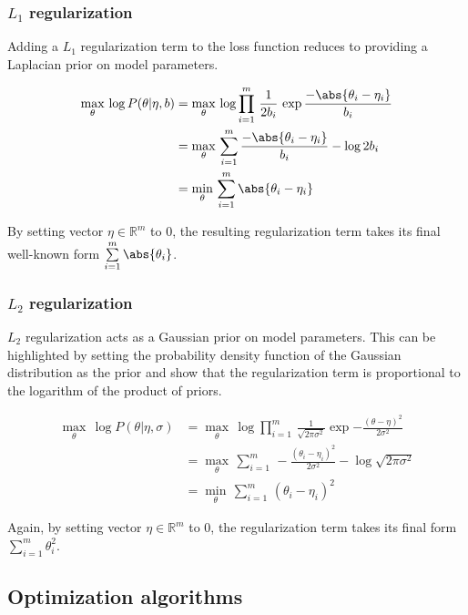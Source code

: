 	\subsubsection{$L_1$ regularization}

	   Adding a $L_1$ regularization term to the loss function reduces to providing a Laplacian
	   prior on model parameters.

	   \begin{align}
	       \max_{\theta}\, \log{P(\theta \vert \eta, b)}
		   & = \max_{\theta}\, \log{\prod\limits_{i=1}^m \, \frac{1}{2b_i}\,
		   \exp{\frac{- \abs{\theta_i - \eta_i}}{b_i}}} \\
		   & = \max_{\theta}\, \sum\limits_{i=1}^m \frac{- \abs{\theta_i - \eta_i}}{b_i} - \log{2b_i} \\
		   & = \min_{\theta}\, \sum\limits_{i=1}^m \abs{\theta_i - \eta_i}
	   \end{align}

	   By setting vector $\eta \in \mathbb{R}^m$ to $0$, the resulting regularization term
	   takes its final well-known form $\sum\limits_{i=1}^m \abs{\theta_i}$.

	\subsubsection{$L_2$ regularization}

	   $L_2$ regularization acts as a Gaussian prior on model parameters.
	   This can be highlighted by setting the probability density function of the Gaussian
	   distribution as the prior and show that the regularization term is proportional
	   to the logarithm of the product of priors.

	   \begin{align}
               \max_{\theta}\, \log{P(\theta \vert \eta, \sigma)}
		   & = \max_{\theta}\, \log{\prod\limits_{i=1}^m \, \frac{1}{\sqrt{2\pi\sigma^2}}
		   \exp{-\frac{(\theta - \eta)^2}{2\sigma^2}}} \\
		   & = \max_{\theta}\, \sum\limits_{i=1}^m \, -\frac{(\theta_i - \eta_i)^2}{2\sigma^2}
		   - \log{\sqrt{2\pi\sigma^2}} \\
		   & = \min_{\theta}\, \sum\limits_{i=1}^m \, (\theta_i - \eta_i)^2
           \end{align}

	   Again, by setting vector $\eta \in \mathbb{R}^m$ to $0$, the regularization term takes its
	   final form $\sum\limits_{i=1}^m \theta_i^2$.

    \subsection{Optimization algorithms} \label{opti}

